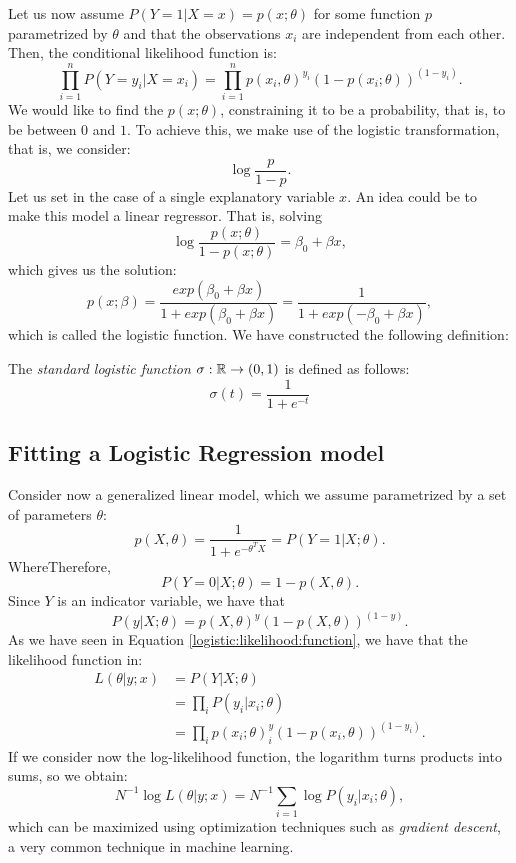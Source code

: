 Let us now assume $P(Y = 1| X = x) = p(x;\theta)$ for some function $p$ parametrized by $\theta$ and that the observations $x_i$ are independent from each other. Then, the conditional likelihood function is:
\begin{equation}\label{logistic:likelihood:function}
\prod_{i=1}^n P(Y = y_i | X = x_i) = \prod_{i=1}^n p(x_i,\theta)^{y_i} \left(1-p(x_i;\theta)\right)^{(1-y_i)}.    
\end{equation}
We would like to find the $p(x;\theta)$, constraining it to be a probability, that is, to be between $0$ and $1$. To achieve this, we make use of the logistic transformation, that is, we consider:
\[
\log\frac{p}{1-p}.   
\]
Let us set in the case of a single explanatory variable $x$. An idea could be to make this model a linear regressor. That is, solving
\[
\log\frac{p(x;\theta)}{1-p(x;\theta)} = \beta_0 + \beta x , 
\]
which gives us the solution:
\[
p(x;\beta) = \frac{exp(\beta_0 +  \beta x)}{1 + exp(\beta_0 +  \beta x)} = \frac{1}{1 + exp\left( - \beta_0 + \beta x\right)},
\]
which is called the logistic function. We have constructed the following definition:
\begin{ndef}
The \emph{standard logistic function} $\sigma: \mathbb{R} \to (0,1)$ is defined as follows:
\[
\sigma(t) = \frac{1}{1+e^{-t}}
\]
\end{ndef}

\subsection{Fitting a Logistic Regression model}

Consider now a generalized linear model, which we assume parametrized by a set of parameters $\theta$:
\[
p(X,\theta) = \frac{1}{1+e^{-\theta^T X}} = P(Y = 1 |X; \theta).    
\]
WhereTherefore, 
\[
P(Y = 0 | X ; \theta) = 1- p(X,\theta). 
\]
Since $Y$ is an indicator variable, we have that
\[
P(y|X;\theta) = p(X,\theta)^y(1-p(X,\theta))^{(1-y)}.
\]
As we have seen in Equation \eqref{logistic:likelihood:function}, we have that the likelihood function in:
\begin{align*}
L(\theta|y;x) & = P(Y|X;\theta) \\
& =\prod_i P(y_i|x_i;\theta) \\
& =  \prod_i p(x_i;\theta)^y_i (1- p(x_i,\theta))^{(1-y_i)}.    
\end{align*}
If we consider now the log-likelihood function, the logarithm turns products into sums, so we obtain:
\[
N^{-1}\log L(\theta|y;x) = N^{-1} \sum_{i=1} \log P(y_i | x_i;\theta),
\]
which can be maximized using optimization techniques such as \emph{gradient descent}, a very common technique in machine learning.

